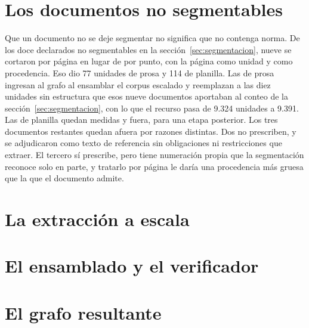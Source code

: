 \documentclass[12pt,a4paper]{report}
\begin{document}
\section{Los documentos no segmentables}
\label{sec:cobertura_no_segmentables}

Que un documento no se deje segmentar no significa que no contenga norma. De los doce declarados no segmentables en la sección~\ref{sec:segmentacion}, nueve se cortaron por página en lugar de por punto, con la página como unidad y como procedencia. Eso dio 77 unidades de prosa y 114 de planilla. Las de prosa ingresan al grafo al ensamblar el corpus escalado y reemplazan a las diez unidades sin estructura que esos nueve documentos aportaban al conteo de la sección~\ref{sec:segmentacion}, con lo que el recurso pasa de 9.324 unidades a 9.391. Las de planilla quedan medidas y fuera, para una etapa posterior. Los tres documentos restantes quedan afuera por razones distintas. Dos no prescriben, y se adjudicaron como texto de referencia sin obligaciones ni restricciones que extraer. El tercero sí prescribe, pero tiene numeración propia que la segmentación reconoce solo en parte, y tratarlo por página le daría una procedencia más gruesa que la que el documento admite.

\section{La extracción a escala}
\label{sec:extraccion_escala}

\section{El ensamblado y el verificador}
\label{sec:ensamblado}


\section{El grafo resultante}
\label{sec:grafo_resultante}
\end{document}
